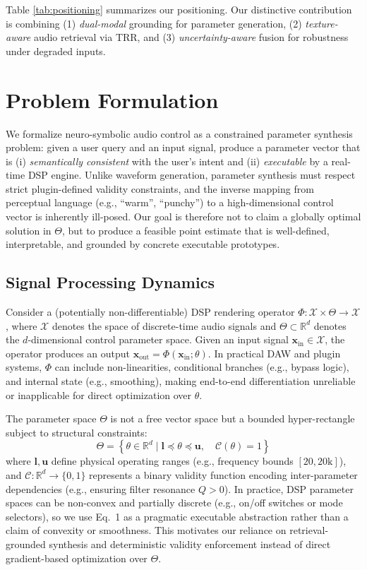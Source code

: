 \documentclass{article}
\begin{document}
Table \ref{tab:positioning} summarizes our positioning. Our distinctive contribution is combining (1) \textit{dual-modal} grounding for parameter generation, (2) \textit{texture-aware} audio retrieval via TRR, and (3) \textit{uncertainty-aware} fusion for robustness under degraded inputs.

\section{Problem Formulation}
\label{sec:problem_formulation}

We formalize neuro-symbolic audio control as a constrained parameter synthesis problem: given a user query and an input signal, produce a parameter vector that is (i) \textit{semantically consistent} with the user's intent and (ii) \textit{executable} by a real-time DSP engine. Unlike waveform generation, parameter synthesis must respect strict plugin-defined validity constraints, and the inverse mapping from perceptual language (e.g., ``warm'', ``punchy'') to a high-dimensional control vector is inherently ill-posed. Our goal is therefore not to claim a globally optimal solution in $\Theta$, but to produce a feasible point estimate that is well-defined, interpretable, and grounded by concrete executable prototypes.

\subsection{Signal Processing Dynamics}
Consider a (potentially non-differentiable) DSP rendering operator $\Phi: \mathcal{X} \times \Theta \to \mathcal{X}$, where $\mathcal{X}$ denotes the space of discrete-time audio signals and $\Theta \subset \mathbb{R}^d$ denotes the $d$-dimensional control parameter space. Given an input signal $\mathbf{x}_{\text{in}} \in \mathcal{X}$, the operator produces an output $\mathbf{x}_{\text{out}} = \Phi(\mathbf{x}_{\text{in}}; \theta)$.
In practical DAW and plugin systems, $\Phi$ can include non-linearities, conditional branches (e.g., bypass logic), and internal state (e.g., smoothing), making end-to-end differentiation unreliable or inapplicable for direct optimization over $\theta$.

The parameter space $\Theta$ is not a free vector space but a bounded hyper-rectangle subject to structural constraints:
\begin{equation}
    \Theta = \left\{ \theta \in \mathbb{R}^d \mid \mathbf{l} \preceq \theta \preceq \mathbf{u}, \quad \mathcal{C}(\theta) = 1 \right\}
\end{equation}
where $\mathbf{l}, \mathbf{u}$ define physical operating ranges (e.g., frequency bounds $[20, 20\text{k}]$), and $\mathcal{C}: \mathbb{R}^d \to \{0, 1\}$ represents a binary validity function encoding inter-parameter dependencies (e.g., ensuring filter resonance $Q > 0$).
In practice, DSP parameter spaces can be non-convex and partially discrete (e.g., on/off switches or mode selectors), so we use Eq.~1 as a pragmatic executable abstraction rather than a claim of convexity or smoothness. This motivates our reliance on retrieval-grounded synthesis and deterministic validity enforcement instead of direct gradient-based optimization over $\Theta$.
\end{document}

